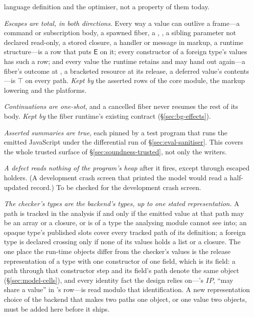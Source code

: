 \begin{description}[leftmargin=2.2em,style=sameline,font=\normalfont\bfseries]
{language definition and the optimiser, not a property of them today.}
\item[A6] \emph{Escapes are total, in both directions.} Every way a value can outlive a frame---a command
or subscription body, a spawned fiber, a , , a sibling parameter not declared
read-only, a stored closure, a handler or message in markup, a runtime structure---is a row that puts
$\mathsf{E}$ on it; every constructor of a foreign type's values has such a row; and every value the
runtime retains and may hand out again---a fiber's outcome at , a bracketed resource at
its release, a deferred value's contents---is $\top$ on every path. \emph{Kept by} the asserted rows of
the core  module, the markup lowering and the platforms.
\item[A7] \emph{Continuations are one-shot}, and a cancelled fiber never resumes the rest of its body.
\emph{Kept by} the fiber runtime's existing contract (\S\ref{sec:bg-effects}).
\item[A8] \emph{Asserted summaries are true}, each pinned by a test program that runs the emitted
JavaScript under the differential run of \S\ref{sec:eval-sanitiser}. This covers the whole trusted
surface of \S\ref{sec:soundness-trusted}, not only the writers.
\item[A9] \emph{A defect reads nothing of the program's heap} after it fires, except through escaped
holders. (A development crash screen that printed the model would read a half-updated record.) To be
checked for the development crash screen.
\item[A10] \emph{The checker's types are the backend's types, up to one stated representation.} A path is
tracked in the analysis if and only if the emitted value at that path may be an array or a closure, or is
of a type the analysing module cannot see into; an opaque type's published slots cover every tracked path
of its definition; a foreign type is declared crossing only if none of its values holds a list or a
closure. The one place the run-time objects differ from the checker's values is the release
representation of a type with one constructor of one field, which is its field: a path through that
constructor step and its field's path denote the same object (\S\ref{sec:model-cells}), and every identity
fact the design relies on---'s $\mathit{IP}$, ``may share a value'' in 's row---is read
modulo that identification. A new representation choice of the backend that makes two paths one object, or
one value two objects, must be added here before it ships.

\end{description}

